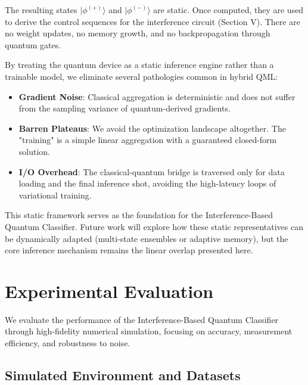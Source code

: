 \documentclass[conference]{IEEEtran}
\begin{document}
The resulting states $|\phi^{(+)}\rangle$ and $|\phi^{(-)}\rangle$ are static. Once computed, they are used to derive the control sequences for the interference circuit (Section V). There are no weight updates, no memory growth, and no backpropagation through quantum gates. 

By treating the quantum device as a static inference engine rather than a trainable model, we eliminate several pathologies common in hybrid QML:
\begin{itemize}
    \item \textbf{Gradient Noise}: Classical aggregation is deterministic and does not suffer from the sampling variance of quantum-derived gradients.
    \item \textbf{Barren Plateaus}: We avoid the optimization landscape altogether. The "training" is a simple linear aggregation with a guaranteed closed-form solution.
    \item \textbf{I/O Overhead}: The classical-quantum bridge is traversed only for data loading and the final inference shot, avoiding the high-latency loops of variational training.
\end{itemize}

This static framework serves as the foundation for the Interference-Based Quantum Classifier. Future work will explore how these static representatives can be dynamically adapted (multi-state ensembles or adaptive memory), but the core inference mechanism remains the linear overlap presented here.

\section{Experimental Evaluation}

We evaluate the performance of the Interference-Based Quantum Classifier through high-fidelity numerical simulation, focusing on accuracy, measurement efficiency, and robustness to noise.

\subsection{Simulated Environment and Datasets}
\end{document}
